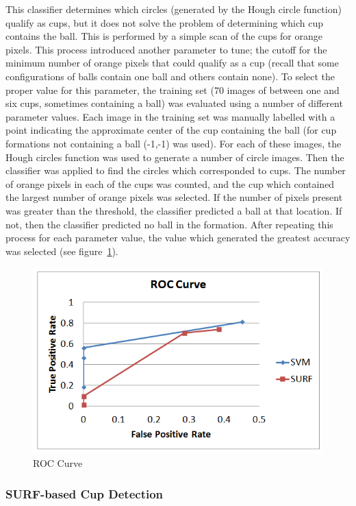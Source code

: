 \documentclass[letterpaper, 10 pt, conference]{ieeeconf}  %
\begin{document}
This classifier determines which circles (generated by the Hough circle function) qualify as cups, but it does not solve the problem of determining which cup contains the ball.  This is performed by a simple scan of the cups for orange pixels.  This process introduced another parameter to tune; the cutoff for the minimum number of orange pixels that could qualify as a cup (recall that some configurations of balls contain one ball and others contain none).  To select the proper value for this parameter, the training set (70 images of between one and six cups, sometimes containing a ball) was evaluated using a number of different parameter values.  Each image in the training set was manually labelled with a point indicating the approximate center of the cup containing the ball (for cup formations not containing a ball (-1,-1) was used).  For each of these images, the Hough circles function was used to generate a number of circle images.  Then the classifier was applied to find the circles which corresponded to cups.  The number of orange pixels in each of the cups was counted, and the cup which contained the largest number of orange pixels was selected.  If the number of pixels present was greater than the threshold, the classifier predicted a ball at that location.  If not, then the classifier predicted no ball in the formation.  After repeating this process for each parameter value, the value which generated the greatest accuracy was selected (see figure~\ref{fig:ROC}).

\begin{figure}[thpb]
      \centering
	  \includegraphics[scale =0.5]{ROC}
      \caption{ROC Curve}
      \label{fig:ROC}
\end{figure}

\subsubsection{SURF-based Cup Detection}
\end{document}
